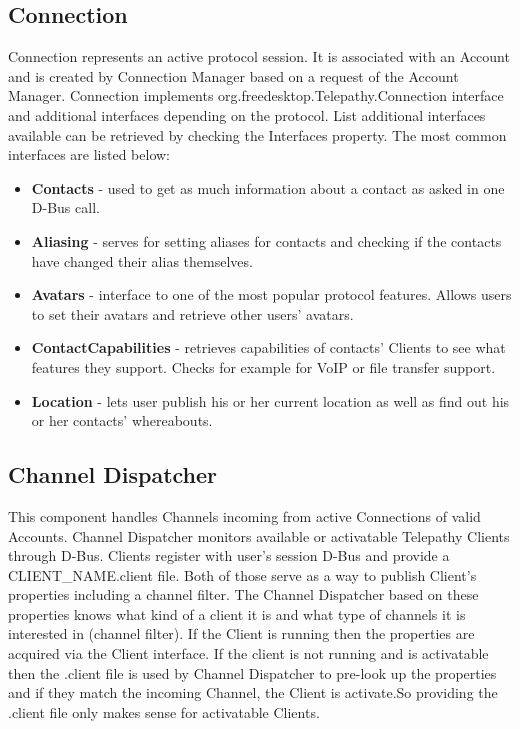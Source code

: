 \subsection*{Connection}
Connection represents an active protocol session. It is associated with an Account and is created by Connection Manager based on a request of the Account Manager. Connection implements org.freedesktop.Telepathy.Connection interface and additional interfaces depending on the protocol. List additional interfaces available can be retrieved by checking the Interfaces property. The most common interfaces are listed below\cite{tpWikiConnection}:

\begin{itemize}

	\item {\bf Contacts} - used to get as much information about a contact as asked in one D-Bus call.

	\item {\bf Aliasing} - serves for setting aliases for contacts and checking if the contacts have changed their alias themselves. 

	\item {\bf Avatars} - interface to one of the most popular protocol features. Allows users to set their avatars and retrieve other users' avatars.

	\item {\bf ContactCapabilities} - retrieves capabilities of contacts' Clients to see what features they support. Checks for example for VoIP or file transfer support.

	\item {\bf Location} - lets user publish his or her current location as well as find out his or her contacts' whereabouts. 

\end{itemize}


\subsection*{Channel Dispatcher}
This component handles Channels incoming from active Connections of valid Accounts. Channel Dispatcher monitors available or activatable Telepathy Clients through D-Bus. Clients register with user's session D-Bus and provide a CLIENT\_NAME.client file. Both of those serve as a way to publish Client's properties including a channel filter. The Channel Dispatcher based on these properties knows what kind of a client it is and what type of channels it is interested in (channel filter). If the Client is running then the properties are acquired via the Client interface. If the client is not running and is activatable then the .client file is used by Channel Dispatcher to pre-look up the properties and if they match the incoming Channel, the Client is activate.So providing the .client file only makes sense for activatable Clients.  

